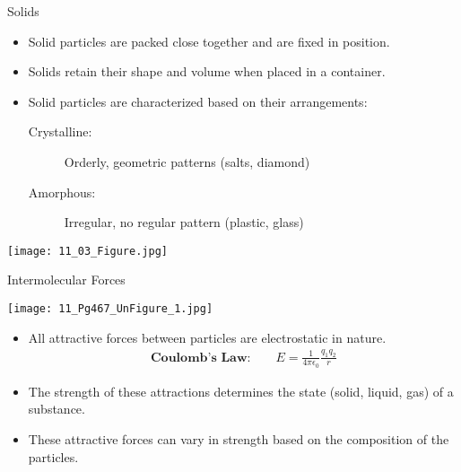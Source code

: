 \documentclass[notes=hide]{beamer}
\begin{document}

\begin{frame}{Solids}
	\begin{itemize}
		\item Solid particles are packed close together and are fixed in
			position.
		\item Solids retain their shape and volume when placed in a
			container.
		\item Solid particles are characterized based on their
			\alert{arrangements}:
			\begin{description}
				\item[Crystalline:] Orderly, geometric patterns
					(salts, diamond)
				\item[Amorphous:] Irregular, no regular pattern
					(plastic, glass)
			\end{description}
	\end{itemize}
	
	\begin{center}
		\texttt{[image: 11\_03\_Figure.jpg]}
	\end{center}
\end{frame}

\begin{frame}{Intermolecular Forces}
	\begin{center}
		\texttt{[image: 11\_Pg467\_UnFigure\_1.jpg]}
	\end{center}

	\begin{itemize}[<+->]
		\item All attractive forces between particles are electrostatic
			in nature.
			\begin{align*}
				\textbf{Coulomb's Law:} \qquad
				E=\frac{1}{4\pi\epsilon_0} \frac{q_1q_2}{r}
			\end{align*}
		\item The strength of these attractions determines the state
			(solid, liquid, gas) of a substance.
		\item These attractive forces can vary in strength based on the
			composition of the particles.
	\end{itemize}
\end{frame}
\end{document}
